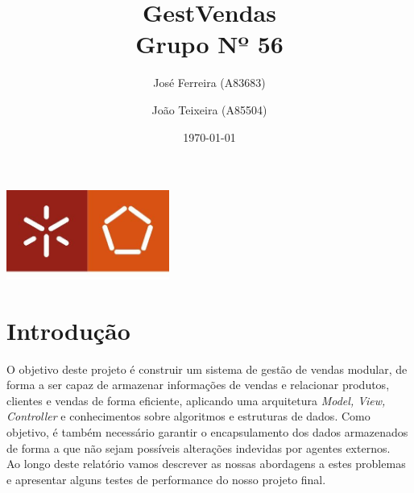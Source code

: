 \documentclass[a4paper]{report}
\begin{document}
\title{GestVendas\\ 
\large Grupo Nº 56}
\author{José Ferreira (A83683) \and João Teixeira (A85504)}
\date{\today}

\begin{center}
    \begin{minipage}{0.75\linewidth}
        \centering
        \includegraphics[width=0.4\textwidth]{eng.jpeg}\par\vspace{1cm}
        \vspace{1.5cm}
        \href{https://www.uminho.pt/PT}
        {\color{black}{\scshape\LARGE Universidade do Minho}} \par
        \vspace{1cm}
        \href{https://www.di.uminho.pt/}
        {\color{black}{\scshape\Large Departamento de Informática}} \par
        \vspace{1.5cm}
        \maketitle
    \end{minipage}
\end{center}

\tableofcontents

\pagebreak

\chapter{Introdução}

O objetivo deste projeto é construir um sistema de gestão de vendas modular,
de forma a ser capaz de armazenar informações de vendas e relacionar produtos,
clientes e vendas de forma eficiente, aplicando uma arquitetura \textit{Model, View,
Controller} e conhecimentos sobre algoritmos e estruturas de dados. Como objetivo, 
é também necessário garantir o encapsulamento dos dados armazenados de forma
a que não sejam possíveis alterações indevidas por agentes externos.\\
Ao longo deste relatório vamos descrever as nossas abordagens a estes problemas e
apresentar alguns testes de performance do nosso projeto final.
\end{document}
